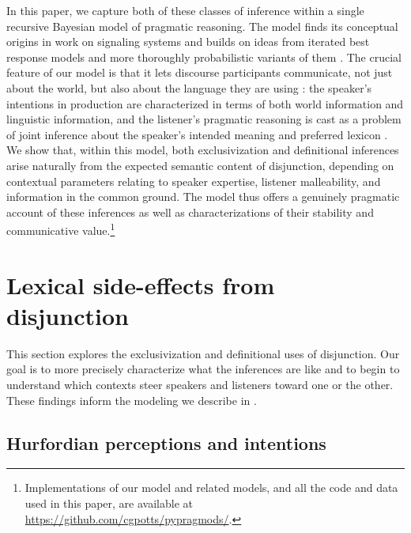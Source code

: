 \documentclass[12pt,twoside]{article}
\renewcommand{\_}{\textbf{\textunderscore\hspace{-4pt}\textunderscore\hspace{-3pt}\textunderscore\hspace{-4pt}\textunderscore}\hspace{0.5pt}}			%
\begin{document}
In this paper, we capture both of these classes of inference within a
single recursive Bayesian model of pragmatic reasoning. The model
finds its conceptual origins in  work on signaling
systems and builds on ideas from iterated best response models
\citep{Jaeger:2007,Jaeger:2011,Franke09DISS} and more thoroughly
probabilistic variants of them
\citep{CamererHo:2004,Frank:Goodman:2012}. The crucial feature of our
model is that it lets discourse participants communicate, not just
about the world, but also about the language they are using
\citep{Bergen:Goodman:Levy:2012,bergen-levy-goodman:2014}: the
speaker's intentions in production are characterized in terms of both
world information and linguistic information, and the listener's
pragmatic reasoning is cast as a problem of joint inference about the
speaker's intended meaning and preferred lexicon
\citep{Smith:Goodman:Frank:2013}. We show that, within this model,
both exclusivization and definitional inferences arise naturally from
the expected semantic content of disjunction, depending on contextual
parameters relating to speaker expertise, listener malleability, and
information in the common ground. The model thus offers a genuinely
pragmatic account of these inferences as well as characterizations of
their stability and communicative value.\footnote{Implementations of
  our model and related models, and all the code and data used in this
  paper, are available at
  \url{https://github.com/cgpotts/pypragmods/}.}


\section{Lexical side-effects from disjunction}\label{sec:data}

This section explores the exclusivization and definitional uses of
disjunction. Our goal is to more precisely characterize what the
inferences are like and to begin to understand which contexts steer
speakers and listeners toward one or the other. These findings inform
the modeling we describe in .


\subsection{Hurfordian perceptions and intentions}\label{sec:data:overlapping}
\end{document}
